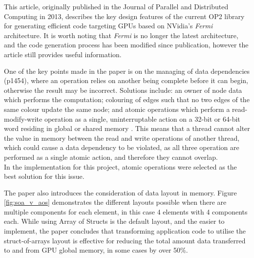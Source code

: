 This article, originally published in the Journal of Parallel and Distributed Computing in 2013, describes the key design features of the current OP2 library for generating efficient code targeting GPUs based on NVidia’s \textit{Fermi} architecture. It is worth noting that \textit{Fermi} is no longer the latest architecture, and the code generation process has been modified since publication, however the article still provides useful information.
\par
One of the key points made in the paper is on the managing of data dependencies (p1454), where an operation relies on another being complete before it can begin, otherwise the result may be incorrect. Solutions include: an owner of node data which performs the computation; colouring of edges such that no two edges of the same colour update the same node; and atomic operations which perform a read-modify-write operation as a single, uninterruptable action on a 32-bit or 64-bit word residing in global or shared memory \cite[p96]{guide}. This means that a thread cannot alter the value in memory between the read and write operations of another thread, which could cause a data dependency to be violated, as all three operation are performed as a single atomic action, and therefore they cannot overlap. \\In the implementation for this project, atomic operations were selected as the best solution for this issue.
\par
The paper also introduces the consideration of data layout in memory. Figure \ref{fig:soa_v_aos} demonstrates the different layouts possible when there are multiple components for each element, in this case 4 elements with 4 components each. While using Array of Structs is the default layout, and the easier to implement, the paper concludes that transforming application code to utilise the struct-of-arrays layout is effective for reducing the total amount data transferred to and from GPU global memory, in some cases by over 50\%.


